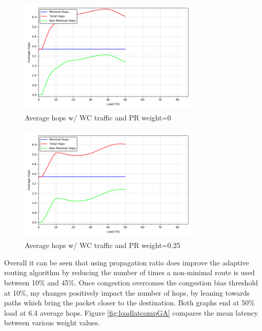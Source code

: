 \documentclass[conference,12pt]{IEEEtran}
\begin{document}
\begin{figure}[ht]
  \begin{center}
    \includegraphics[width=3.4in,height=2.2in]{figures/loadavehops_GA_0.png}
  \end{center}
   \vspace{-0.25in}
 \caption[load average hops - 0 weight]{Average hops w/ WC traffic and PR weight=0}
 \label{fig:loadavehops0}
\end{figure}
\begin{figure}[ht]
  \begin{center}
    \includegraphics[width=3.4in,height=2.2in]{figures/loadavehops_GA_0_25.png}
  \end{center}
   \vspace{-0.25in}
 \caption[load average hops - 0.25 weight]{Average hops w/ WC traffic and PR weight=0.25}
 \label{fig:loadavehops25}
\end{figure}

Overall it can be seen that using propagation ratio does improve the adaptive routing algorithm by reducing the number of times a non-minimal route is used between 10\% and 45\%. Once congestion overcomes the congestion bias threshold at 10\%, my changes positively impact the number of hops, by leaning towards paths which bring the packet closer to the destination. Both graphs end at 50\% load at 6.4 average hops. Figure \ref{fig:loadlatcompGA} compares the mean latency between various weight values.
\end{document}
